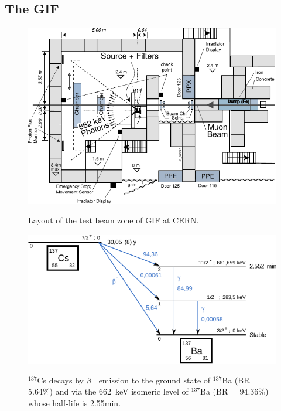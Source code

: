 		\subsection{The \acl{GIF}}
		\label{chapt5:ssec:GIF}
	
	\begin{figure}[H]
		\centering
		\includegraphics[width = .8\linewidth]{fig/chapt5/GIF-Layout.pdf}\\
		\caption{\label{fig:GIFLayout} Layout of the test beam zone of GIF at CERN.}
	\end{figure}
	
\begingroup\setlength{\intextsep}{5pt}\setlength{\columnsep}{15pt}
	
	\begin{figure}
		\centering
		\includegraphics[width = \linewidth]{fig/chapt5/Cs137.pdf}\\
		\caption{\label{fig:CsSource} $^{137}$Cs decays by $\beta^-$ emission to the ground state of $^{137}$Ba (BR = 5.64\%) and via the \SI{662}{keV} isomeric level of $^{137}$Ba (BR = 94.36\%) whose half-life is 2.55min.}
	\end{figure}
		
